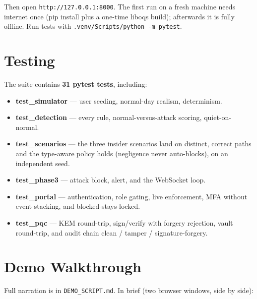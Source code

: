 \documentclass[
]{article}
\providecommand{\tightlist}{%
  \setlength{\itemsep}{0pt}\setlength{\parskip}{0pt}}
\begin{document}
Then open \texttt{http://127.0.0.1:8000}. The first run on a fresh
machine needs internet once (pip install plus a one-time liboqs build);
afterwards it is fully offline. Run tests with
\texttt{.venv/Scripts/python\ -m\ pytest}.

\section{Testing}\label{testing}

The suite contains \textbf{31 pytest tests}, including:

\begin{itemize}
\tightlist
\item
  \textbf{test\_simulator} --- user seeding, normal-day realism,
  determinism.
\item
  \textbf{test\_detection} --- every rule, normal-versus-attack scoring,
  quiet-on-normal.
\item
  \textbf{test\_scenarios} --- the three insider scenarios land on
  distinct, correct paths and the type-aware policy holds (negligence
  never auto-blocks), on an independent seed.
\item
  \textbf{test\_phase3} --- attack block, alert, and the WebSocket loop.
\item
  \textbf{test\_portal} --- authentication, role gating, live
  enforcement, MFA without event stacking, and blocked-stays-locked.
\item
  \textbf{test\_pqc} --- KEM round-trip, sign/verify with forgery
  rejection, vault round-trip, and audit chain clean / tamper /
  signature-forgery.
\end{itemize}

\section{Demo Walkthrough}\label{demo-walkthrough}

Full narration is in \texttt{DEMO\_SCRIPT.md}. In brief (two browser
windows, side by side):
\end{document}
